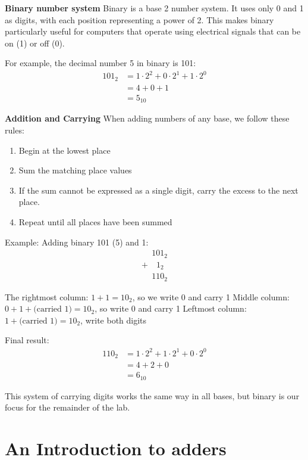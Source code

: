 \documentclass[12pt]{labmanual}
\begin{document}
\noindent\textbf{Binary number system}\hfill\break
Binary is a base 2 number system. It uses only 0 and 1 as digits, with each position representing a power of 2. This makes binary particularly useful for computers that operate using electrical signals that can be on (1) or off (0).

For example, the decimal number 5 in binary is 101:
\begin{align*}
101_2 &= 1 \cdot 2^2 + 0 \cdot 2^1 + 1 \cdot 2^0 \\
&= 4 + 0 + 1 \\
&= 5_{10}
\end{align*}

\noindent\textbf{Addition and Carrying}\hfill\break
When adding numbers of any base, we follow these rules:
\begin{enumerate}
    \item Begin at the lowest place
    \item Sum the matching place values
    \item If the sum cannot be expressed as a single digit, carry the excess to the next place.
    \item Repeat until all places have been summed
\end{enumerate}

Example: Adding binary 101 (5) and 1:
\begin{equation*}
\begin{array}{r}
  \phantom{+}101_2\\
  +\phantom{10}1_2\\\hline
  \phantom{+}110_2
\end{array}
\end{equation*}

The rightmost column: $1 + 1 = 10_2$, so we write 0 and carry 1
Middle column: $0 + 1 + \text{(carried 1)} = 10_2$, so write 0 and carry 1
Leftmost column: $1 + \text{(carried 1)} = 10_2$, write both digits

Final result:
\begin{align*}    
110_2 &= 1 \cdot 2^2 + 1 \cdot 2^1 + 0 \cdot 2^0 \\
&= 4 + 2 + 0 \\
&= 6_{10}
\end{align*}

This system of carrying digits works the same way in all bases, but binary is our focus for the remainder of the lab.

\label{sec:review}

\section{An Introduction to adders}
\end{document}
